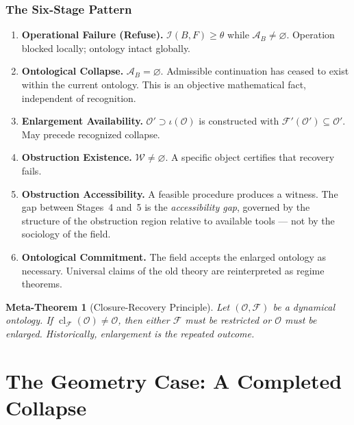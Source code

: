 \documentclass[12pt,oneside]{book}
\theoremstyle{plain}
\newtheorem{metatheorem}[theorem]{Meta-Theorem}
\theoremstyle{definition}
\theoremstyle{remark}
\newcommand{\Oold}{\mathcal{O}}
\newcommand{\Onew}{\mathcal{O}'}
\newcommand{\F}{\mathcal{F}}
\newcommand{\Admiss}{\mathcal{A}}
\newcommand{\Inadmiss}{\mathcal{I}}
\newcommand{\W}{\mathcal{W}}
\newcommand{\cl}{\operatorname{cl}}
\begin{document}
\section{The Six-Stage Pattern}

\begin{enumerate}[label=\textbf{Stage \arabic*.}, leftmargin=*, itemsep=5pt]

\item \textbf{Operational Failure (Refuse).}
$\Inadmiss(B, F) \geq \theta$ while $\Admiss_B \neq \varnothing$.
Operation blocked locally; ontology intact globally.

\item \textbf{Ontological Collapse.}
$\Admiss_B = \varnothing$. Admissible continuation has ceased to exist
within the current ontology. This is an objective mathematical fact,
independent of recognition.

\item \textbf{Enlargement Availability.}
$\Onew \supset \iota(\Oold)$ is constructed with $\F'(\Onew) \subseteq \Onew$.
May precede recognized collapse.

\item \textbf{Obstruction Existence.}
$\W \neq \varnothing$. A specific object certifies that recovery fails.

\item \textbf{Obstruction Accessibility.}
A feasible procedure produces a witness. The gap between Stages~4 and~5
is the \emph{accessibility gap}, governed by the structure of the obstruction
region relative to available tools --- not by the sociology of the field.

\item \textbf{Ontological Commitment.}
The field accepts the enlarged ontology as necessary. Universal claims of
the old theory are reinterpreted as regime theorems.

\end{enumerate}

\begin{metatheorem}[Closure-Recovery Principle]
\label{meta:CRP}
Let $(\Oold, \F)$ be a dynamical ontology. If $\cl_\F(\Oold) \neq \Oold$,
then either $\F$ must be restricted or $\Oold$ must be enlarged.
Historically, enlargement is the repeated outcome.
\end{metatheorem}

\part{The Geometry Case: A Completed Collapse}
\end{document}
